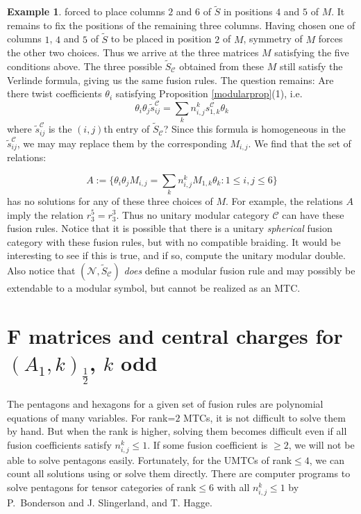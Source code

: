 \documentclass[12pt,psamsfonts]{amsart}
\newcommand{\CC}{\mathcal{C}}
\newcommand{\mN}{\mathcal{N}}
\newcommand{\tS}{\tilde{S}}
\newcommand{\ts}{\tilde{s}}
\numberwithin{equation}{section}
\theoremstyle{definition}
\newtheorem{ex}[theorem]{Example}
\begin{document}
\begin{ex}
forced to place columns $2$ and $6$ of $\tS$ in positions $4$ and
$5$ of $M$.  It remains to fix the positions of the remaining
three columns.  Having chosen one of columns $1$, $4$ and $5$ of
$\tS$ to be placed in position $2$ of $M$, symmetry of $M$ forces
the other two choices.  Thus we arrive at the three matrices $M$
satisfying the five conditions above. The three possible $\tS_\CC$
obtained from these $M$ still satisfy the Verlinde formula, giving
us the same fusion rules.  The question remains: Are there twist
coefficients $\theta_i$ satisfying Proposition
\ref{modularprop}(1), i.e.
$$\theta_i\theta_j \ts^\CC_{ij}=\sum_k n_{i,j}^ks^\CC_{1,k}\theta_k$$ where $\ts^\CC_{ij}$ is the
$(i,j)$th entry of $\tS_\CC$?  Since this formula is homogeneous
in the $\ts^\CC_{ij}$, we may may replace them by the
corresponding $M_{i,j}$.  We find that the set of relations:

$$A:=\{\theta_i\theta_j M_{i,j}=\sum_k n_{i,j}^kM_{1,k}\theta_k: 1\leq i,j\leq 6\}$$
has no solutions for any of these three choices of $M$.  For
example, the relations $A$ imply the relation $r_3^5=r_3^3$.  Thus
no unitary modular category $\CC$ can have these fusion rules.
Notice that it is possible that there is a unitary
\emph{spherical} fusion category with these fusion rules, but with
no compatible braiding.  It would be interesting to see if this is
true, and if so, compute the unitary modular double.  Also notice
that $(\mN,\tS_\CC)$ \emph{does} define a modular fusion rule and
may possibly be extendable to a modular symbol, but cannot be
realized as an MTC.
\end{ex}



\section{F matrices and central charges for $(A_1,k)_{\frac{1}{2}}$, $k$ odd }\label{Fmatrices}

The pentagons and hexagons for a given set of fusion rules are
polynomial equations of many variables.  For rank=$2$ MTCs, it is
not difficult to solve them by hand.  But when the rank is
higher, solving them becomes difficult even if all fusion
coefficients satisfy $n_{i,j}^k\leq 1$.  If some fusion coefficient is
$\geq 2$, we will not be able to solve pentagons easily.
Fortunately, for the UMTCs of rank$\leq 4$, we can count all
solutions using \cite{MS2}\cite{KW}\cite{TuWe}\cite{Kitaev2} or
solve them directly.
 There are computer programs to solve pentagons for tensor
categories of rank$\leq 6$ with all $n_{i,j}^k\leq 1$ by P.\
Bonderson and J. Slingerland, and T. Hagge.
\end{document}
